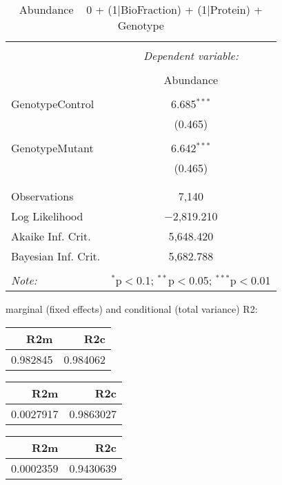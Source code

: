 \documentclass[11pt]{report}
\begin{document}
\begin{table}[!htbp] \centering 
  \caption{Abundance ~ 0 + (1|BioFraction) + (1|Protein) + Genotype} 
  \label{} 
\begin{tabular}{@{\extracolsep{5pt}}lc} 
\\[-1.8ex]\hline 
\hline \\[-1.8ex] 
 & \multicolumn{1}{c}{\textit{Dependent variable:}} \\ 
\cline{2-2} 
\\[-1.8ex] & Abundance \\ 
\hline \\[-1.8ex] 
 GenotypeControl & 6.685$^{***}$ \\ 
  & (0.465) \\ 
  & \\ 
 GenotypeMutant & 6.642$^{***}$ \\ 
  & (0.465) \\ 
  & \\ 
\hline \\[-1.8ex] 
Observations & 7,140 \\ 
Log Likelihood & $-$2,819.210 \\ 
Akaike Inf. Crit. & 5,648.420 \\ 
Bayesian Inf. Crit. & 5,682.788 \\ 
\hline 
\hline \\[-1.8ex] 
\textit{Note:}  & \multicolumn{1}{r}{$^{*}$p$<$0.1; $^{**}$p$<$0.05; $^{***}$p$<$0.01} \\ 
\end{tabular} 
\end{table} 
marginal (fixed effects) and conditional (total variance) R2:

\begin{tabular}{r|r}
\hline
R2m & R2c\\
\hline
0.982845 & 0.984062\\
\hline
\end{tabular}

\begin{tabular}{r|r}
\hline
R2m & R2c\\
\hline
0.0027917 & 0.9863027\\
\hline
\end{tabular}

\begin{tabular}{r|r}
\hline
R2m & R2c\\
\hline
0.0002359 & 0.9430639\\
\hline
\end{tabular}
\end{document}
